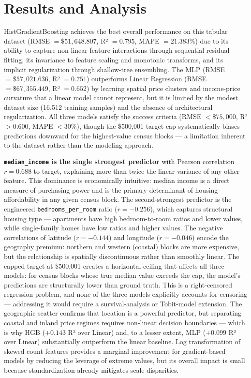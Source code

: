 \section{Results and Analysis}

\begin{resultbox}
HistGradientBoosting achieves the best overall performance on this tabular dataset (RMSE $= \$51{,}648.807$, R² $= 0.795$, MAPE $= 21.383\%$) due to its ability to capture non-linear feature interactions through sequential residual fitting, its invariance to feature scaling and monotonic transforms, and its implicit regularization through shallow-tree ensembling. The MLP (RMSE $= \$57{,}021.636$, R² $= 0.751$) outperforms Linear Regression (RMSE $= \$67{,}355.449$, R² $= 0.652$) by learning spatial price clusters and income-price curvature that a linear model cannot represent, but it is limited by the modest dataset size (16,512 training samples) and the absence of architectural regularization. All three models satisfy the success criteria (RMSE $< \$75{,}000$, R² $> 0.600$, MAPE $< 30\%$), though the \$500,001 target cap systematically biases predictions downward for the highest-value census blocks — a limitation inherent to the dataset rather than the modeling approach.
\end{resultbox}

\begin{notebox}
\textbf{\texttt{median\_income} is the single strongest predictor} with Pearson correlation $r = 0.688$ to target, explaining more than twice the linear variance of any other feature. This dominance is economically intuitive: median income is a direct measure of purchasing power and is the primary determinant of housing affordability in any given census block. The second-strongest predictor is the engineered \texttt{bedrooms\_per\_room} ratio ($r = -0.256$), which captures structural housing type — apartments have high bedroom-to-room ratios and lower values, while single-family homes have low ratios and higher values. The negative correlations of latitude ($r = -0.144$) and longitude ($r = -0.046$) encode the geography premium: northern and western (coastal) blocks are more expensive, but the relationship is spatially discontinuous rather than smoothly linear. The capped target at \$500,001 creates a horizontal ceiling that affects all three models: for census blocks whose true median value exceeds the cap, the model's predictions are structurally lower than ground truth. This is a right-censored regression problem, and none of the three models explicitly accounts for censoring — addressing it would require a survival-analysis or Tobit-model extension. The geographic scatter confirms that location is a powerful predictor, but separating coastal and inland price regimes requires non-linear decision boundaries — which is why HGB ($+0.143$ R² over Linear) and, to a lesser extent, MLP ($+0.099$ R² over Linear) substantially outperform the linear baseline. Log transformation of skewed count features provides a marginal improvement for gradient-based models by reducing the leverage of extreme values, but its overall impact is small because standardization already mitigates scale disparities.
\end{notebox}

